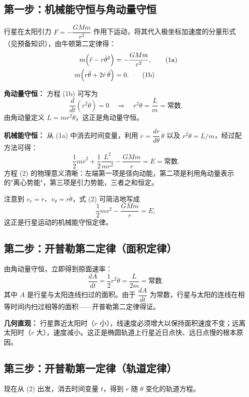 \documentclass[12pt,a4paper]{article}
\begin{document}
\subsection{第一步：机械能守恒与角动量守恒}

行星在太阳引力 $F = -\dfrac{GMm}{r^2}$ 作用下运动，将其代入极坐标加速度的分量形式（见预备知识），由牛顿第二定律得：
\begin{align}
m\Bigl( \ddot{r} - r\dot{\theta}^2 \Bigr) &= -\frac{GMm}{r^2}, \tag{1a}\\
m\Bigl( r\ddot{\theta} + 2\dot{r}\,\dot{\theta} \Bigr) &= 0. \tag{1b}
\end{align}

\textbf{角动量守恒：} 方程 (1b) 可写为
\[
\frac{d}{dt}(r^2\dot{\theta}) = 0 \quad\Longrightarrow\quad
r^2\dot{\theta} = \frac{L}{m} = \text{常数}.
\]
由角动量定义 $L = mr^2\dot{\theta}$，这正是角动量守恒。

\textbf{机械能守恒：} 从 (1a) 中消去时间变量，利用 $\dot{r} = \dfrac{dr}{d\theta}\,\dot{\theta}$ 以及 $r^2\dot{\theta} = L/m$，经过配方法可得：
\[
\frac{1}{2}m\dot{r}^2 + \frac{1}{2}\frac{L^2}{mr^2} - \frac{GMm}{r} = E = \text{常数}.
\tag{2}
\]
方程 (2) 的物理意义清晰：左端第一项是径向动能，第二项是利用角动量表示的"离心势能"，第三项是引力势能，三者之和恒定。

注意到 $v_r = \dot{r}$、$v_\theta = r\dot{\theta}$，式 (2) 可简洁地写成
\[
\frac{1}{2}mv^2 - \frac{GMm}{r} = E,
\]
这正是行星运动的机械能守恒定律。

\subsection{第二步：开普勒第二定律（面积定律）}

由角动量守恒，立即得到掠面速率：
\[
\frac{dA}{dt} = \frac{1}{2}r^2\dot{\theta} = \frac{L}{2m} = \text{常数}.
\tag{3}
\]
其中 $A$ 是行星与太阳连线扫过的面积。由于 $\dfrac{dA}{dt}$ 为常数，行星与太阳的连线在相等时间内扫过相等的面积——开普勒第二定律得证。

\textbf{几何直观：} 行星靠近太阳时（$r$ 小），线速度必须增大以保持面积速度不变；远离太阳时（$r$ 大），速度减小。这正是椭圆轨道上行星近日点快、远日点慢的根本原因。

\subsection{第三步：开普勒第一定律（轨道定律）}

现在从 (2) 出发，消去时间变量 $t$，得到 $r$ 随 $\theta$ 变化的轨道方程。
\end{document}
